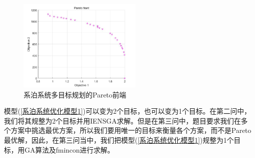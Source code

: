             \begin{figure}
                \centering
                \includegraphics[width = 6cm]{images/pareto_qiandan.jpg}
                \caption{系泊系统多目标规划的Pareto前端}
                \label{系泊系统多目标规划的Pareto前端}
            \end{figure}
            \par
            模型(\ref{系泊系统优化模型1})可以变为2个目标，也可以变为1个目标。在第二问中，我们将其规整为2个目标并用IENSGA求解。但是在第三问中，题目要求我们在多个方案中挑选最优方案，所以我们要用唯一的目标来衡量各个方案，而不是Pareto最优解，因此，在第三问当中，我们把模型(\ref{系泊系统优化模型1})规整为1个目标，用GA算法及fmincon进行求解。

